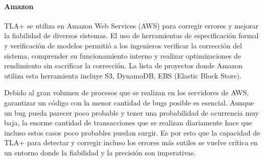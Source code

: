 \documentclass[runningheads]{llncs}
\begin{document}
\paragraph{Amazon}
TLA+ se utiliza en Amazon Web Services (AWS) para corregir errores y mejorar la fiabilidad de diversos sistemas. El uso de herramientas de especificación formal y verificación de modelos permitió a los ingenieros verificar la corrección del sistema, comprender su funcionamiento interno y realizar optimizaciones de rendimiento sin sacrificar la corrección. La lista de proyectos donde Amazon utiliza esta herramienta incluye S3, DynamoDB, EBS (Elastic Block Store).

Debido al gran volumen de procesos que se realizan en los servidores de AWS, garantizar un código con la menor cantidad de bugs posible es esencial. Aunque un bug pueda parecer poco probable y tener una probabilidad de ocurrencia muy baja, la enorme cantidad de transacciones que se realizan diariamente hace que incluso estos casos poco probables puedan surgir. Es por esto que la capacidad de TLA+ para detectar y corregir incluso los errores más sutiles se vuelve crítica en un entorno donde la fiabilidad y la precisión son imperativas.
\end{document}
